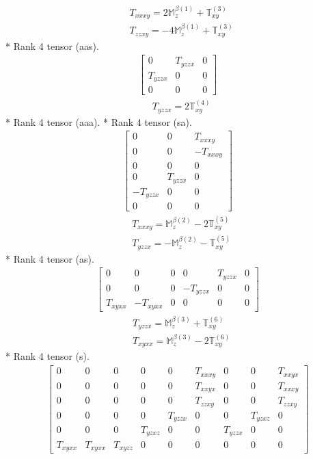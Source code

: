 \documentclass[fleqn,8pt,landscape]{jsarticle}
\begin{document}
\begin{align*}
& T_{xxxy} = 2 \mathbb{M}_{z}^{\beta(1)} + \mathbb{T}_{xy}^{(3)} \\
& T_{zzxy} = - 4 \mathbb{M}_{z}^{\beta(1)} + \mathbb{T}_{xy}^{(3)}
\end{align*}
* Rank 4 tensor (aas).
\begin{align*}
\begin{bmatrix} 0 & T_{yzzx} & 0 \\ T_{yzzx} & 0 & 0 \\ 0 & 0 & 0 \end{bmatrix}
\end{align*}
\begin{align*}
& T_{yzzx} = 2 \mathbb{T}_{xy}^{(4)}
\end{align*}
* Rank 4 tensor (aaa).
* Rank 4 tensor (sa).
\begin{align*}
\begin{bmatrix} 0 & 0 & T_{xxxy} \\ 0 & 0 & - T_{xxxy} \\ 0 & 0 & 0 \\ 0 & T_{yzzx} & 0 \\ - T_{yzzx} & 0 & 0 \\ 0 & 0 & 0 \end{bmatrix}
\end{align*}
\begin{align*}
& T_{xxxy} = \mathbb{M}_{z}^{\beta(2)} - 2 \mathbb{T}_{xy}^{(5)} \\
& T_{yzzx} = - \mathbb{M}_{z}^{\beta(2)} - \mathbb{T}_{xy}^{(5)}
\end{align*}
* Rank 4 tensor (as).
\begin{align*}
\begin{bmatrix} 0 & 0 & 0 & 0 & T_{yzzx} & 0 \\ 0 & 0 & 0 & - T_{yzzx} & 0 & 0 \\ T_{xyxx} & - T_{xyxx} & 0 & 0 & 0 & 0 \end{bmatrix}
\end{align*}
\begin{align*}
& T_{yzzx} = \mathbb{M}_{z}^{\beta(3)} + \mathbb{T}_{xy}^{(6)} \\
& T_{xyxx} = \mathbb{M}_{z}^{\beta(3)} - 2 \mathbb{T}_{xy}^{(6)}
\end{align*}
* Rank 4 tensor (s).
\begin{align*}
\begin{bmatrix} 0 & 0 & 0 & 0 & 0 & T_{xxxy} & 0 & 0 & T_{xxyx} \\ 0 & 0 & 0 & 0 & 0 & T_{xxyx} & 0 & 0 & T_{xxxy} \\ 0 & 0 & 0 & 0 & 0 & T_{zzxy} & 0 & 0 & T_{zzxy} \\ 0 & 0 & 0 & 0 & T_{yzzx} & 0 & 0 & T_{yzxz} & 0 \\ 0 & 0 & 0 & T_{yzxz} & 0 & 0 & T_{yzzx} & 0 & 0 \\ T_{xyxx} & T_{xyxx} & T_{xyzz} & 0 & 0 & 0 & 0 & 0 & 0 \end{bmatrix}
\end{align*}
\end{document}
